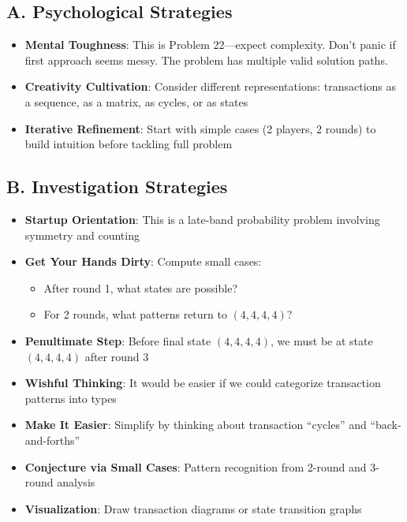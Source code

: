 \documentclass[]{article}
\begin{document}
\begin{strategicbox}
\subsection*{A. Psychological Strategies}
\begin{itemize}[leftmargin=*]
    \item \textbf{Mental Toughness}: This is Problem 22---expect complexity. Don't panic if first approach seems messy. The problem has multiple valid solution paths.
    \item \textbf{Creativity Cultivation}: Consider different representations: transactions as a sequence, as a matrix, as cycles, or as states
    \item \textbf{Iterative Refinement}: Start with simple cases (2 players, 2 rounds) to build intuition before tackling full problem
\end{itemize}

\subsection*{B. Investigation Strategies}
\begin{itemize}[leftmargin=*]
    \item \textbf{Startup Orientation}: This is a late-band probability problem involving symmetry and counting
    \item \textbf{Get Your Hands Dirty}: Compute small cases:
    \begin{itemize}
        \item After round 1, what states are possible?
        \item For 2 rounds, what patterns return to $(4,4,4,4)$?
    \end{itemize}
    \item \textbf{Penultimate Step}: Before final state $(4,4,4,4)$, we must be at state $(4,4,4,4)$ after round 3
    \item \textbf{Wishful Thinking}: It would be easier if we could categorize transaction patterns into types
    \item \textbf{Make It Easier}: Simplify by thinking about transaction ``cycles'' and ``back-and-forths''
    \item \textbf{Conjecture via Small Cases}: Pattern recognition from 2-round and 3-round analysis
    \item \textbf{Visualization}: Draw transaction diagrams or state transition graphs
\end{itemize}


\end{strategicbox}
\end{document}
